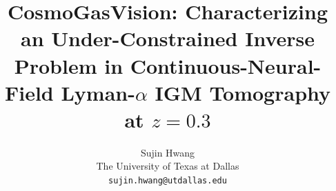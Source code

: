 \documentclass[10pt,twocolumn,letterpaper]{article}
\title{\texorpdfstring{CosmoGasVision: Characterizing an Under-Constrained Inverse Problem in Continuous-Neural-Field Lyman-$\alpha$ IGM Tomography at $z=0.3$}{CosmoGasVision: Characterizing an Under-Constrained Inverse Problem in Continuous-Neural-Field Lyman-alpha IGM Tomography at z=0.3}}
\author{Sujin Hwang\\
The University of Texas at Dallas\\
{\tt\small sujin.hwang@utdallas.edu}
}
\begin{document}
\maketitle







{
    \small
    
    
}

% 
\end{document}
